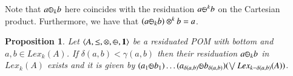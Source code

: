 \documentclass[a4paper]{elsarticle}
\newtheorem{proposition}{Proposition}
\newcommand{\monop}{\otimes}
\newcommand{\1}{\mathbf{1}}
\def\odiv{{ \ominus\hspace{-8pt}:}\;}
\begin{document}
Note that $a \odiv_k b$ here coincides with the residuation $a \odiv^k b$ 
on the Cartesian product. Furthermore, we have 
that $(a \odiv_k b) \otimes^k b = a$.

\begin{proposition}
	\label{div1}
	Let $\langle A, \leq, \monop, \odiv, \1 \rangle$
	be a residuated POM with bottom and $a, b \in Lex_k(A)$.
	If $\delta(a,b) < \gamma(a,b)$ then their residuation $a \odiv_k b$ 
	in $Lex_k(A)$ exists and it is given by
$
	(a_1 \odiv b_1) \ldots  (a_{\delta(a, b)}  \odiv b_{\delta(a, b)}) 
	(\bigvee Lex_{k - \delta(a, b)}(A))
$.
\end{proposition}
\end{document}
